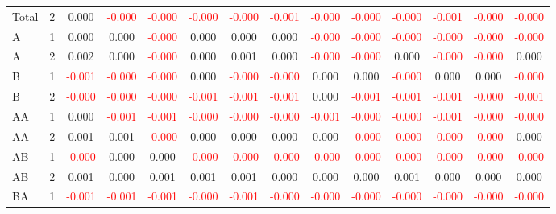 \begin{table}[!htb]
{\begin{tabular}{llcccccccccccc}
Total & 2 & 0.000 & \textcolor{red}{-0.000} & \textcolor{red}{-0.000} & \textcolor{red}{-0.000} & \textcolor{red}{-0.000} & \textcolor{red}{-0.001} & \textcolor{red}{-0.000} & \textcolor{red}{-0.000} & \textcolor{red}{-0.000} & \textcolor{red}{-0.001} & \textcolor{red}{-0.000} & \textcolor{red}{-0.000}\\
A & 1 & 0.000 & 0.000 & \textcolor{red}{-0.000} & 0.000 & 0.000 & 0.000 & \textcolor{red}{-0.000} & \textcolor{red}{-0.000} & \textcolor{red}{-0.000} & \textcolor{red}{-0.000} & \textcolor{red}{-0.000} & \textcolor{red}{-0.000}\\
A & 2 & 0.002 & 0.000 & \textcolor{red}{-0.000} & 0.000 & 0.001 & 0.000 & \textcolor{red}{-0.000} & \textcolor{red}{-0.000} & 0.000 & \textcolor{red}{-0.000} & \textcolor{red}{-0.000} & 0.000\\
B & 1 & \textcolor{red}{-0.001} & \textcolor{red}{-0.000} & \textcolor{red}{-0.000} & 0.000 & \textcolor{red}{-0.000} & \textcolor{red}{-0.000} & 0.000 & 0.000 & \textcolor{red}{-0.000} & 0.000 & 0.000 & \textcolor{red}{-0.000}\\
B & 2 & \textcolor{red}{-0.000} & \textcolor{red}{-0.000} & \textcolor{red}{-0.000} & \textcolor{red}{-0.001} & \textcolor{red}{-0.001} & \textcolor{red}{-0.001} & 0.000 & \textcolor{red}{-0.001} & \textcolor{red}{-0.001} & \textcolor{red}{-0.001} & \textcolor{red}{-0.000} & \textcolor{red}{-0.001}\\
AA & 1 & 0.000 & \textcolor{red}{-0.001} & \textcolor{red}{-0.001} & \textcolor{red}{-0.000} & \textcolor{red}{-0.000} & \textcolor{red}{-0.000} & \textcolor{red}{-0.001} & \textcolor{red}{-0.000} & \textcolor{red}{-0.000} & \textcolor{red}{-0.001} & \textcolor{red}{-0.000} & \textcolor{red}{-0.000}\\
AA & 2 & 0.001 & 0.001 & \textcolor{red}{-0.000} & 0.000 & 0.000 & 0.000 & 0.000 & \textcolor{red}{-0.000} & \textcolor{red}{-0.000} & \textcolor{red}{-0.000} & \textcolor{red}{-0.000} & 0.000\\
AB & 1 & \textcolor{red}{-0.000} & 0.000 & 0.000 & \textcolor{red}{-0.000} & \textcolor{red}{-0.000} & \textcolor{red}{-0.000} & \textcolor{red}{-0.000} & \textcolor{red}{-0.000} & \textcolor{red}{-0.000} & \textcolor{red}{-0.000} & \textcolor{red}{-0.000} & \textcolor{red}{-0.000}\\
AB & 2 & 0.001 & 0.000 & 0.001 & 0.001 & 0.001 & 0.000 & 0.000 & 0.000 & 0.001 & 0.000 & 0.000 & 0.000\\
BA & 1 & \textcolor{red}{-0.001} & \textcolor{red}{-0.001} & \textcolor{red}{-0.001} & \textcolor{red}{-0.000} & \textcolor{red}{-0.001} & \textcolor{red}{-0.000} & \textcolor{red}{-0.000} & \textcolor{red}{-0.000} & \textcolor{red}{-0.000} & \textcolor{red}{-0.000} & \textcolor{red}{-0.000} & \textcolor{red}{-0.000}\\

\end{tabular}}
\end{table}

